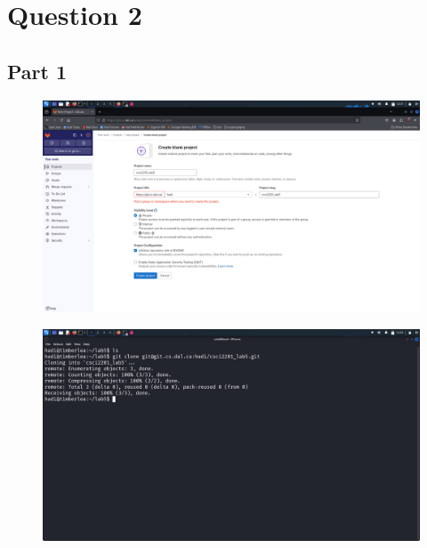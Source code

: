 \documentclass{article}
\numberwithin{equation}{subsection}
\begin{document}
	\section{Question 2}

	\subsection{Part 1}
	\begin{figure}[H]
		\includegraphics[width=430pt]{pics/Screenshot_2025-03-07_12_01_55.png}
	\end{figure}
	\begin{figure}[H]
		\includegraphics[width=430pt]{pics/Screenshot_2025-03-07_12_03_18.png}
	\end{figure}


	\newpage
\end{document}

